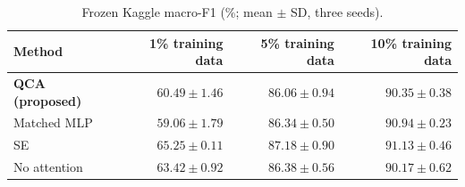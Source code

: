 \begin{table}[t]
\centering
\caption{Frozen Kaggle macro-F1 (\%; mean $\pm$ SD, three seeds).}
\label{tab:low-data-f1}
\small
\begin{tabular}{lrrr}
\toprule
Method & 1\% training data & 5\% training data & 10\% training data \\
\midrule
\textbf{QCA (proposed)} & $60.49 \pm 1.46$ & $86.06 \pm 0.94$ & $90.35 \pm 0.38$ \\
Matched MLP & $59.06 \pm 1.79$ & $86.34 \pm 0.50$ & $90.94 \pm 0.23$ \\
SE & $65.25 \pm 0.11$ & $87.18 \pm 0.90$ & $91.13 \pm 0.46$ \\
No attention & $63.42 \pm 0.92$ & $86.38 \pm 0.56$ & $90.17 \pm 0.62$ \\
\bottomrule
\end{tabular}
\end{table}
